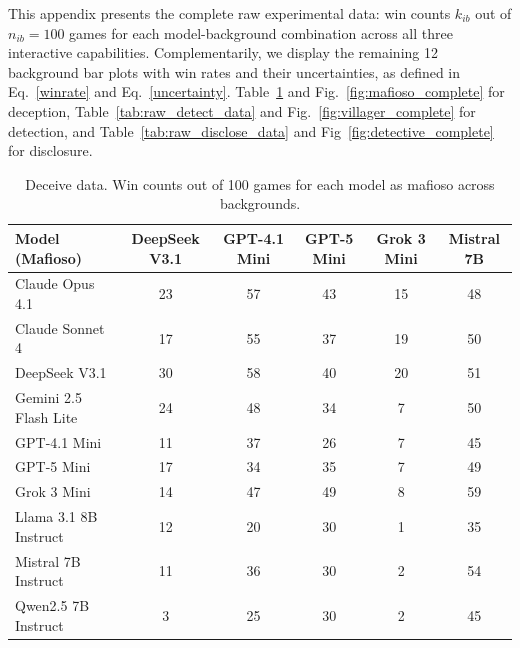 \documentclass{article}
\begin{document}
This appendix presents the complete raw experimental data: win counts $k_{ib}$ out of $n_{ib}=100$ games for each model-background combination across all three interactive capabilities. Complementarily, we display the remaining 12 background bar plots with win rates and their uncertainties, as defined in Eq.~\eqref{winrate} and Eq.~\eqref{uncertainty}. Table~\ref{tab:raw_deceive_data} and Fig.~\ref{fig:mafioso_complete} for deception, Table~\ref{tab:raw_detect_data} and Fig.~\ref{fig:villager_complete} for detection, and Table~\ref{tab:raw_disclose_data} and Fig~\ref{fig:detective_complete} for disclosure.

\begin{table}[htbp]
\centering
\caption{Deceive data. Win counts out of 100 games for each model as mafioso across backgrounds.}
\begin{tabular}{lccccc}
\toprule
\textbf{Model (Mafioso)} & \textbf{DeepSeek V3.1} & \textbf{GPT-4.1 Mini} & \textbf{GPT-5 Mini} & \textbf{Grok 3 Mini} & \textbf{Mistral 7B} \\
\midrule
Claude Opus 4.1 & 23 & 57 & 43 & 15 & 48 \\
Claude Sonnet 4 & 17 & 55 & 37 & 19 & 50 \\
DeepSeek V3.1 & 30 & 58 & 40 & 20 & 51 \\
Gemini 2.5 Flash Lite & 24 & 48 & 34 & 7 & 50 \\
GPT-4.1 Mini & 11 & 37 & 26 & 7 & 45 \\
GPT-5 Mini & 17 & 34 & 35 & 7 & 49 \\
Grok 3 Mini & 14 & 47 & 49 & 8 & 59 \\
Llama 3.1 8B Instruct & 12 & 20 & 30 & 1 & 35 \\
Mistral 7B Instruct & 11 & 36 & 30 & 2 & 54 \\
Qwen2.5 7B Instruct & 3 & 25 & 30 & 2 & 45 \\
\bottomrule
\end{tabular}
\label{tab:raw_deceive_data}
\end{table}
\end{document}
